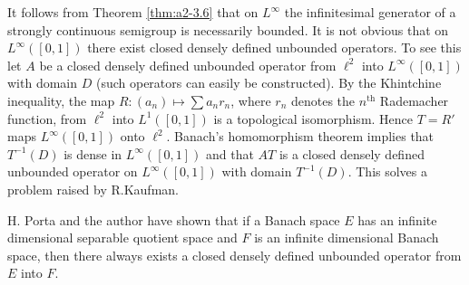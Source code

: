 \begin{remark*}[Final]\label{rem:a2-final}
It follows from Theorem \ref{thm:a2-3.6} that on $L^{\infty}$ the infinitesimal generator of a strongly continuous semigroup is necessarily bounded.
It is not obvious that on $L^{\infty}([0,1])$ there exist closed densely defined unbounded operators.
To see this let $A$ be a closed densely defined unbounded operator from $\ell^2$ into $L^{\infty}([0,1])$ with domain $D$ (such operators can easily be constructed).
By the Khintchine inequality, the map $R \colon (a_{n}) \mapsto \sum a_{n}r_{n}$, where $r_{n}$ denotes the $n^{\text{th}}$ Rademacher function, from $\ell^2$ into $L^1([0,1])$ is a topological isomorphism.
Hence $T = R'$ maps $L^{\infty}([0,1])$ onto $\ell^2$.
Banach's homomorphism theorem implies that $T^{-1}(D)$ is dense in $L^{\infty}([0,1])$ and that $AT$ is a closed densely defined unbounded operator on $L^{\infty}([0,1])$ with domain $T^{-1}(D)$.
This solves a problem raised by R.Kaufman.

H. Porta and the author 
have shown that if a Banach space $E$ has an infinite dimensional separable quotient space and $F$ is an infinite dimensional Banach space, then there always exists a closed densely defined unbounded operator from $E$ into $F$.
\end{remark*}
